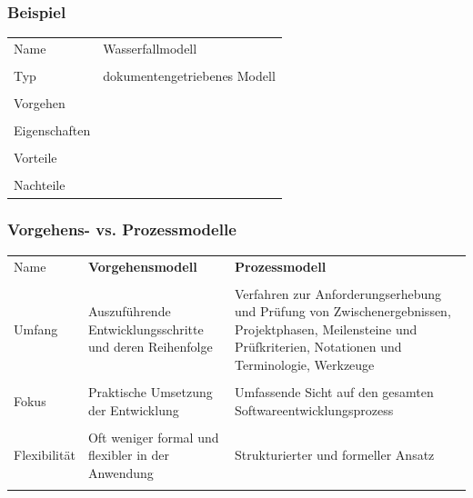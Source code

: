 \documentclass[main.tex]{subfiles}
\begin{document}
\subsubsection*{Beispiel}
\begin{table}[H]
    \centering
    \begin{tabular}{p{2cm} p{13.5cm}}
        \scriptsize{Name} & Wasserfallmodell  \\ \\
        \scriptsize{Typ} & dokumentengetriebenes Modell \\ \\
       \scriptsize{Vorgehen}  & \\ \\
       \scriptsize{Eigenschaften} &  \\  \\
       \scriptsize{Vorteile} &  \\ \\
       \scriptsize{Nachteile} & 
    \end{tabular}
\end{table}
\subsubsection*{Vorgehens- vs. Prozessmodelle}
\begin{table}[H]
    \centering
    \begin{tabular}{p{2cm} p{6.75cm} p{6.75cm}}
        \scriptsize{Name} & \textbf{Vorgehensmodell} & \textbf{Prozessmodell} \\ \\
        \scriptsize{Umfang} & Auszuführende Entwicklungsschritte und deren Reihenfolge  & Verfahren zur Anforderungserhebung und Prüfung von Zwischenergebnissen,  Projektphasen, Meilensteine und Prüfkriterien, Notationen und Terminologie, Werkzeuge\\ \\
        \scriptsize{Fokus} & Praktische Umsetzung der Entwicklung & Umfassende Sicht auf den gesamten Softwareentwicklungsprozess \\ \\
        \scriptsize{Flexibilität} & Oft weniger formal und flexibler in der Anwendung & Strukturierter und formeller Ansatz \\ \\
    \end{tabular}
\end{table}
\end{document}
